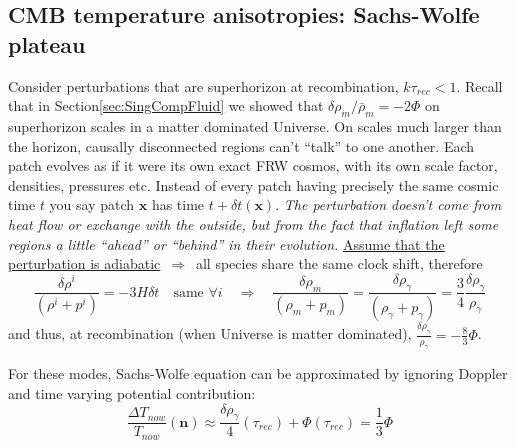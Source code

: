 \subsection{CMB temperature anisotropies: Sachs-Wolfe plateau}\label{sec:CMBSWPlateau}
Consider perturbations that are superhorizon at recombination, $k\tau_{rec}<1$. Recall that in Section\ref{sec:SingCompFluid} we showed that $\delta \rho_m /\bar{\rho}_m = -2\Phi$ on superhorizon scales in a matter dominated Universe.
On scales much larger than the horizon, causally disconnected regions can’t “talk” to one another. Each patch evolves as if it were its own exact FRW cosmos, with its own scale factor, densities, pressures etc.
Instead of every patch having precisely the same cosmic time $t$ you say patch $\mathbf{x}$ has time $t+\delta t(\mathbf{x})$. \emph{The perturbation doesn’t come from heat flow or exchange with the outside, but from the fact that inflation left some regions a little “ahead” or “behind” in their evolution.}
\underline{Assume that the perturbation is adiabatic} $\,\Rightarrow\,$ all species share the same clock shift, therefore
\begin{equation}
    \frac{\delta \rho^i}{(\rho^i+p^i) } = -3H \delta t \quad \text{same }\forall i \quad \Rightarrow \quad \frac{\delta \rho_m}{(\rho_m+p_m) } =\frac{\delta \rho_\gamma}{(\rho_\gamma+p_\gamma) } =\frac{3}{4}\frac{\delta \rho_\gamma}{\rho_\gamma} 
\end{equation}
and thus, at recombination (when Universe is matter dominated), $\frac{\delta \rho_\gamma}{\rho_\gamma} = -\frac{8}{3}\Phi$.

For these modes, Sachs-Wolfe equation can be approximated by ignoring Doppler and time varying potential contribution:
\begin{equation}
    \frac{\Delta T_{now}}{T_{now}} (\mathbf{n}) \approx \frac{\delta \rho_\gamma}{4} (\tau_{rec}) + \Phi (\tau_{rec})= \frac{1}{3}\Phi
\end{equation}

